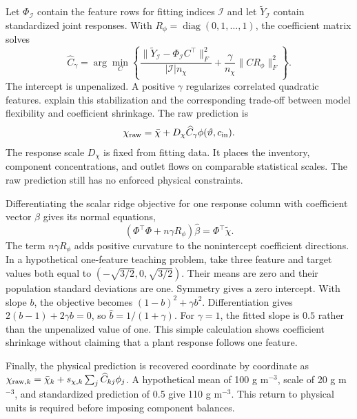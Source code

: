 Let $\Phi_{\mathcal I}$ contain the feature rows for fitting indices $\mathcal I$ and let $\widetilde Y_{\mathcal I}$ contain standardized joint responses. With $R_\phi=\operatorname{diag}(0,1,\ldots,1)$, the coefficient matrix solves
\begin{equation}
\widehat C_\gamma=\arg\min_C
\left\{\frac{\|\widetilde Y_{\mathcal I}-\Phi_{\mathcal I}C^\top\|_F^2}
{|\mathcal I|n_\chi}+\frac{\gamma}{n_\chi}\|CR_\phi\|_F^2\right\}.
\label{eq:plant_ridge_fit}
\end{equation}
The intercept is unpenalized. A positive $\gamma$ regularizes correlated quadratic features. \citet{Hastie2009} explain this stabilization and the corresponding trade-off between model flexibility and coefficient shrinkage. The raw prediction is
\begin{equation}
\chi_{\rm raw}=\bar\chi+D_\chi\widehat C_\gamma\phi(\vartheta,c_{\rm in}).
\label{eq:plant_raw_prediction}
\end{equation}
The response scale $D_\chi$ is fixed from fitting data. It places the inventory, component concentrations, and outlet flows on comparable statistical scales. The raw prediction still has no enforced physical constraints.

Differentiating the scalar ridge objective for one response column with coefficient vector $\beta$ gives its normal equations,
\begin{equation}
(\Phi^\top\Phi+n\gamma R_\phi)\widehat\beta=\Phi^\top\widetilde\chi.
\end{equation}
The term $n\gamma R_\phi$ adds positive curvature to the nonintercept coefficient directions. In a hypothetical one-feature teaching problem, take three feature and target values both equal to $(-\sqrt{3/2},0,\sqrt{3/2})$. Their means are zero and their population standard deviations are one. Symmetry gives a zero intercept. With slope $b$, the objective becomes $(1-b)^2+\gamma b^2$. Differentiation gives $2(b-1)+2\gamma b=0$, so $\widehat b=1/(1+\gamma)$. For $\gamma=1$, the fitted slope is $0.5$ rather than the unpenalized value of one. This simple calculation shows coefficient shrinkage without claiming that a plant response follows one feature.

Finally, the physical prediction is recovered coordinate by coordinate as $\chi_{{\rm raw},k}=\bar\chi_k+s_{\chi,k}\sum_j\widehat C_{kj}\phi_j$. A hypothetical mean of 100 g m$^{-3}$, scale of 20 g m$^{-3}$, and standardized prediction of 0.5 give 110 g m$^{-3}$. This return to physical units is required before imposing component balances.

